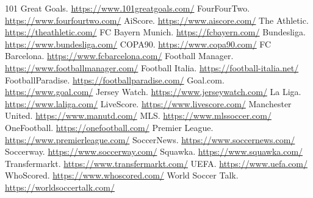 \documentclass{report}
\begin{document}
\begin{thebibliography}{24}
 101 Great Goals. \url{https://www.101greatgoals.com/}
 FourFourTwo. \url{https://www.fourfourtwo.com/}
 AiScore. \url{https://www.aiscore.com/}
 The Athletic. \url{https://theathletic.com/}
 FC Bayern Munich. \url{https://fcbayern.com/}
 Bundesliga. \url{https://www.bundesliga.com/}
 COPA90. \url{https://www.copa90.com/}
 FC Barcelona. \url{https://www.fcbarcelona.com/}
 Football Manager. \url{https://www.footballmanager.com/}
 Football Italia. \url{https://football-italia.net/}
 FootballParadise. \url{https://footballparadise.com/}
 Goal.com. \url{https://www.goal.com/}
 Jersey Watch. \url{https://www.jerseywatch.com/}
 La Liga. \url{https://www.laliga.com/}
 LiveScore. \url{https://www.livescore.com/}
 Manchester United. \url{https://www.manutd.com/}
 MLS. \url{https://www.mlssoccer.com/}
 OneFootball. \url{https://onefootball.com/}
 Premier League. \url{https://www.premierleague.com/}
 SoccerNews. \url{https://www.soccernews.com/}
 Soccerway. \url{https://www.soccerway.com/}
 Squawka. \url{https://www.squawka.com/}
 Transfermarkt. \url{https://www.transfermarkt.com/}
 UEFA. \url{https://www.uefa.com/}
 WhoScored. \url{https://www.whoscored.com/}
 World Soccer Talk. \url{https://worldsoccertalk.com/}
\end{thebibliography}
\end{document}
